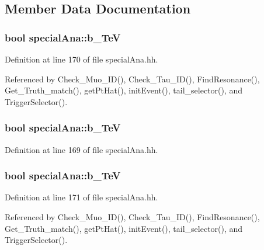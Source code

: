 \subsection{Member Data Documentation}
\subsubsection[{b\-\_\-13\-Te\-V}]{\setlength{\rightskip}{0pt plus 5cm}bool special\-Ana\-::b\-\_\-Te\-V}\label{classspecialAna_aa8d4b44be61d1e2f53c63a5dfb42382d}


Definition at line 170 of file special\-Ana.\-hh.



Referenced by Check\-\_\-\-Muo\-\_\-\-I\-D(), Check\-\_\-\-Tau\-\_\-\-I\-D(), Find\-Resonance(), Get\-\_\-\-Truth\-\_\-match(), get\-Pt\-Hat(), init\-Event(), tail\-\_\-selector(), and Trigger\-Selector().

\subsubsection[{b\-\_\-14\-Te\-V}]{\setlength{\rightskip}{0pt plus 5cm}bool special\-Ana\-::b\-\_\-Te\-V}\label{classspecialAna_abcfabe97f1d18a464f420c1b47582338}


Definition at line 169 of file special\-Ana.\-hh.

\subsubsection[{b\-\_\-8\-Te\-V}]{\setlength{\rightskip}{0pt plus 5cm}bool special\-Ana\-::b\-\_\-Te\-V}\label{classspecialAna_ac4ed94b197d05282ab2aeed78bea4dad}


Definition at line 171 of file special\-Ana.\-hh.



Referenced by Check\-\_\-\-Muo\-\_\-\-I\-D(), Check\-\_\-\-Tau\-\_\-\-I\-D(), Find\-Resonance(), Get\-\_\-\-Truth\-\_\-match(), get\-Pt\-Hat(), init\-Event(), tail\-\_\-selector(), and Trigger\-Selector().


